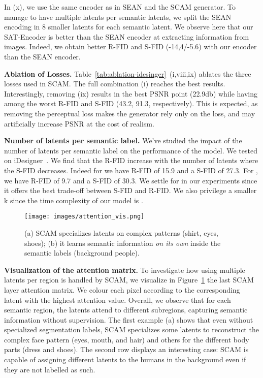 \documentclass[runningheads]{llncs}
\makeatletter
\newcommand{\mname}{SCAM\@\xspace}
\makeatother
\begin{document}
In (x), we use the same encoder as in SEAN and the SCAM generator. To manage to have multiple latents per semantic latents, we split the SEAN encoding in 8 smaller latents for each semantic latent. We observe here that our SAT-Encoder is better than the SEAN encoder at extracting information from images. Indeed, we obtain better R-FID and S-FID (-14,4/-5.6) with our encoder than the SEAN encoder.

\noindent \textbf{Ablation of Losses.} 
Table~\ref{tab:ablation-idesinger}~(i,viii,ix) ablates the three  losses used in \mname.  
The full combination (i) reaches the best results. 
Interestingly, removing  (ix) results in the best PSNR point (22.9db) while having among the worst R-FID and S-FID (43.2, 91.3, respectively). 
This is expected, as removing the perceptual loss makes the generator rely only on the  loss, and may artificially increase PSNR at the cost of realism.

\noindent \textbf{Number  of latents per semantic label.} 
We've studied the impact of the number of latents  per semantic label on the performance of the model. We tested  on iDesigner~\cite{idesigner}. We find that the R-FID increase with the number of latents where the S-FID decreases. Indeed for  we have R-FID of 15.9 and a S-FID of 27.3. For , we have  R-FID of 9.7 and a S-FID of 30.3. We settle for  in our experiments since it offers the best trade-off between S-FID and R-FID. We also privilege a smaller k since the time complexity of our model is .





\begin{figure}[b]
\caption{\small{(a) \mname specializes latents on complex patterns (shirt, eyes, shoes); (b) it learns semantic information \emph{on its own} inside the semantic labels (background people).}}
\texttt{[image: images/attention\_vis.png]}
\label{fig:attention_vis}
\end{figure}
\noindent \textbf{Visualization of the attention matrix.} 
To investigate how using multiple latents per region is handled by \mname, we visualize in Figure~\ref{fig:attention_vis} the last \mname layer attention matrix. We colour each pixel according to the corresponding latent with the highest attention value.
Overall, we observe that for each semantic region, the latents attend to different subregions, capturing semantic information without supervision. 
The first example (a) shows that even without specialized segmentation labels, \mname specializes some latents to reconstruct the complex face pattern (eyes, mouth, and hair) and others for the different body parts (dress and shoes). 
The second row displays an interesting case: 
\mname is capable of assigning different latents to the humans in the background even if they are not labelled as such.
\end{document}
